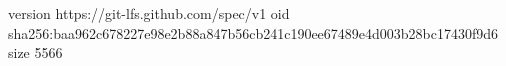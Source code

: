 version https://git-lfs.github.com/spec/v1
oid sha256:baa962c678227e98e2b88a847b56cb241c190ee67489e4d003b28bc17430f9d6
size 5566
